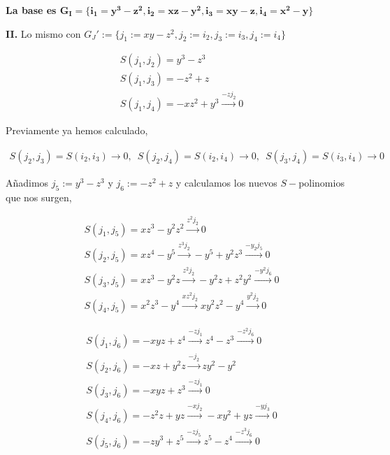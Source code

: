 \documentclass{article}
\begin{document}
\textbf{La base es
$\boldsymbol{G_I = \{ i_1= y^3 - z^2, i_2=xz - y^2, i_3=xy - z, i_4=x^2-y \}}$}
~

\bigskip

    \textbf{II.} Lo mismo con
$G_J':=\{ j_1:=xy-z^2, j_2:=i_2, j_3:=i_3, j_4:=i_4\}$

\begin{equation}
    \begin{array}{l}
        S(j_1, j_2) = y^3 - z^3 \\
        S(j_1, j_3) = -z^2 + z \\
        S(j_1, j_4) = -xz^2 + y^3 \xrightarrow{-z j_2} 0
    \end{array}
\end{equation}

Previamente ya hemos calculado,

\begin{equation}
    \begin{array}{l}
        S(j_2, j_3) = S(i_2, i_3) \rightarrow 0, \, \, \,
        S(j_2, j_4) = S(i_2, i_4) \rightarrow 0, \, \, \,
        S(j_3, j_4) = S(i_3, i_4) \rightarrow 0
    \end{array}
\end{equation}

Añadimos $j_5:=y^3 - z^3$ y $j_6:=-z^2 + z$ y calculamos los nuevos
$S-$polinomios que nos surgen,

\begin{equation}
    \begin{array}{l}
        S(j_1, j_5) = xz^3 -y^2z^2 \xrightarrow{z^2 j_2} 0 \\
        S(j_2, j_5) = xz^4 -y^5\xrightarrow{z^3 j_2} -y^5 + y^2z^3 \xrightarrow{-y_2 j_5} 0 \\
        S(j_3, j_5) = xz^3 - y^2z \xrightarrow{z^2 j_2} -y^2z + z^2y^2 \xrightarrow{-y^2 j_6} 0 \\
        S(j_4, j_5) = x^2z^3 - y^4 \xrightarrow{xz^2 j_2} xy^2z^2 - y^4 \xrightarrow{y^2 j_2} 0 
    \end{array}
\end{equation}

\begin{equation}
    \begin{array}{l}
        S(j_1, j_6) = - xyz + z^4 \xrightarrow{-z j_1} z^4 - z^3 \xrightarrow{-z^2 j_6} 0 \\
        S(j_2, j_6) = -xz + y^2z \xrightarrow{-j_2} zy^2 - y^2\\
        S(j_3, j_6) = -xyz + z^3 \xrightarrow{-z j_1} 0\\
        S(j_4, j_6) = -z^2z + yz \xrightarrow{-x j_2} -xy^2 + yz \xrightarrow{-y j_3} 0\\
        S(j_5, j_6) = -zy^3 +z^5 \xrightarrow{-z j_5} z^5 - z^4 \xrightarrow{-z^3 j_6} 0 
    \end{array}
\end{equation}
\end{document}
